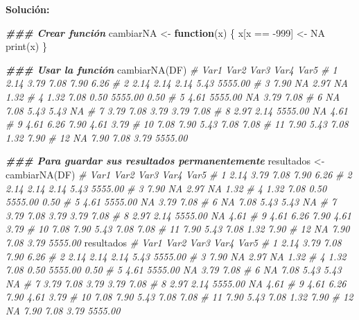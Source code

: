 \documentclass[
]{article}
\newenvironment{Shaded}{\begin{snugshade}}{\end{snugshade}}
\newcommand{\CommentTok}[1]{\textcolor[rgb]{0.56,0.35,0.01}{\textit{#1}}}
\newcommand{\ConstantTok}[1]{\textcolor[rgb]{0.00,0.00,0.00}{#1}}
\newcommand{\ControlFlowTok}[1]{\textcolor[rgb]{0.13,0.29,0.53}{\textbf{#1}}}
\newcommand{\DecValTok}[1]{\textcolor[rgb]{0.00,0.00,0.81}{#1}}
\newcommand{\DocumentationTok}[1]{\textcolor[rgb]{0.56,0.35,0.01}{\textbf{\textit{#1}}}}
\newcommand{\FunctionTok}[1]{\textcolor[rgb]{0.00,0.00,0.00}{#1}}
\newcommand{\NormalTok}[1]{#1}
\newcommand{\OtherTok}[1]{\textcolor[rgb]{0.56,0.35,0.01}{#1}}
\newcommand{\SpecialCharTok}[1]{\textcolor[rgb]{0.00,0.00,0.00}{#1}}
\theoremstyle{definition}
\theoremstyle{definition}
\theoremstyle{definition}
\theoremstyle{definition}
\theoremstyle{remark}
\begin{document}
\textbf{Solución:}

\begin{Shaded}
\begin{Highlighting}[]
\DocumentationTok{\#\#\# Crear función}
\NormalTok{cambiarNA }\OtherTok{\textless{}{-}} \ControlFlowTok{function}\NormalTok{(x) \{}
\NormalTok{  x[x }\SpecialCharTok{==} \SpecialCharTok{{-}}\DecValTok{999}\NormalTok{] }\OtherTok{\textless{}{-}} \ConstantTok{NA}
  \FunctionTok{print}\NormalTok{(x)}
\NormalTok{\}}

\DocumentationTok{\#\#\# Usar la función}
\FunctionTok{cambiarNA}\NormalTok{(DF)}
\CommentTok{\#    Var1    Var2    Var3    Var4    Var5}
\CommentTok{\# 1  2.14    3.79    7.08    7.90    6.26}
\CommentTok{\# 2  2.14    2.14    2.14    5.43 5555.00}
\CommentTok{\# 3  7.90      NA    2.97      NA    1.32}
\CommentTok{\# 4  1.32    7.08    0.50 5555.00    0.50}
\CommentTok{\# 5  4.61 5555.00      NA    3.79    7.08}
\CommentTok{\# 6    NA    7.08    5.43    5.43      NA}
\CommentTok{\# 7  3.79    7.08    3.79    3.79    7.08}
\CommentTok{\# 8  2.97    2.14 5555.00      NA    4.61}
\CommentTok{\# 9  4.61    6.26    7.90    4.61    3.79}
\CommentTok{\# 10 7.08    7.90    5.43    7.08    7.08}
\CommentTok{\# 11 7.90    5.43    7.08    1.32    7.90}
\CommentTok{\# 12   NA    7.90    7.08    3.79 5555.00}

\DocumentationTok{\#\#\# Para guardar sus resultados permanentemente}
\NormalTok{resultados }\OtherTok{\textless{}{-}} \FunctionTok{cambiarNA}\NormalTok{(DF)}
\CommentTok{\#    Var1    Var2    Var3    Var4    Var5}
\CommentTok{\# 1  2.14    3.79    7.08    7.90    6.26}
\CommentTok{\# 2  2.14    2.14    2.14    5.43 5555.00}
\CommentTok{\# 3  7.90      NA    2.97      NA    1.32}
\CommentTok{\# 4  1.32    7.08    0.50 5555.00    0.50}
\CommentTok{\# 5  4.61 5555.00      NA    3.79    7.08}
\CommentTok{\# 6    NA    7.08    5.43    5.43      NA}
\CommentTok{\# 7  3.79    7.08    3.79    3.79    7.08}
\CommentTok{\# 8  2.97    2.14 5555.00      NA    4.61}
\CommentTok{\# 9  4.61    6.26    7.90    4.61    3.79}
\CommentTok{\# 10 7.08    7.90    5.43    7.08    7.08}
\CommentTok{\# 11 7.90    5.43    7.08    1.32    7.90}
\CommentTok{\# 12   NA    7.90    7.08    3.79 5555.00}
\NormalTok{resultados}
\CommentTok{\#    Var1    Var2    Var3    Var4    Var5}
\CommentTok{\# 1  2.14    3.79    7.08    7.90    6.26}
\CommentTok{\# 2  2.14    2.14    2.14    5.43 5555.00}
\CommentTok{\# 3  7.90      NA    2.97      NA    1.32}
\CommentTok{\# 4  1.32    7.08    0.50 5555.00    0.50}
\CommentTok{\# 5  4.61 5555.00      NA    3.79    7.08}
\CommentTok{\# 6    NA    7.08    5.43    5.43      NA}
\CommentTok{\# 7  3.79    7.08    3.79    3.79    7.08}
\CommentTok{\# 8  2.97    2.14 5555.00      NA    4.61}
\CommentTok{\# 9  4.61    6.26    7.90    4.61    3.79}
\CommentTok{\# 10 7.08    7.90    5.43    7.08    7.08}
\CommentTok{\# 11 7.90    5.43    7.08    1.32    7.90}
\CommentTok{\# 12   NA    7.90    7.08    3.79 5555.00}
\end{Highlighting}
\end{Shaded}
\end{document}
